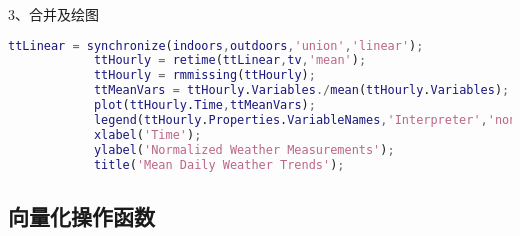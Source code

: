             3、合并及绘图
                \begin{lstlisting}[language=Matlab]
            ttLinear = synchronize(indoors,outdoors,'union','linear');
            ttHourly = retime(ttLinear,tv,'mean');
            ttHourly = rmmissing(ttHourly);
            ttMeanVars = ttHourly.Variables./mean(ttHourly.Variables);
            plot(ttHourly.Time,ttMeanVars);
            legend(ttHourly.Properties.VariableNames,'Interpreter','none');
            xlabel('Time');
            ylabel('Normalized Weather Measurements');
            title('Mean Daily Weather Trends');
                \end{lstlisting}
    \subsection{向量化操作函数}
